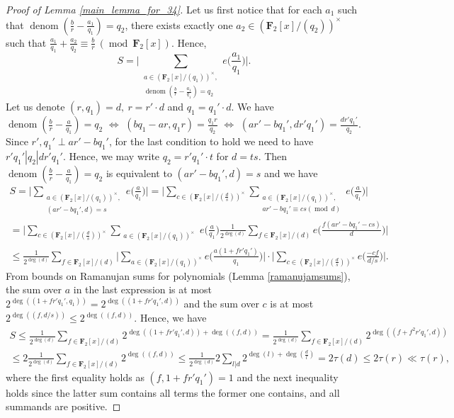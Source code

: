 \documentclass[11pt, reqno]{amsart}
\numberwithin{equation}{section}
\newcommand{\zff}{\mathbf{F}_2[x]}
\newcommand{\zffmi}[1]{(\zff/(#1))^{\times}}
\newcommand\denom{\operatorname{denom}}
\newcommand\modd{\operatorname{mod}}
\begin{document}
\begin{proof}[Proof of Lemma \ref{main_lemma_for_34}]
    Let us first notice that for each $a_1$ such that $\denom(\frac{b}{r}-\frac{a_1}{q_1})=q_2$, there exists exactly one $a_2 \in \zffmi{q_2}$ such that $\frac{a_1}{q_1}+\frac{a_2}{q_2} \equiv \frac{b}{r} \ (\modd \ \zff)$. Hence, $$S=\bigg| \sum_{\substack{a \in \zffmi{q_1}, \\ \denom(\frac{b}{r}-\frac{a_1}{q_1})=q_2}} e \Big( \frac{a_1}{q_1} \Big) \bigg|.$$
    Let us denote $(r, q_1)=d, \ r=r' \cdot d$ and $q_1 = q_1' \cdot d$. We have $\denom(\frac{b}{r}-\frac{a}{q_1})=q_2$ $\iff$ $(bq_1-ar, q_1r)=\frac{q_1r}{q_2}$ $\iff$ $(ar'-bq_1', dr'q_1')=\frac{dr'q_1'}{q_2}$. Since $r', q_1' \perp ar'-bq_1'$, for the last condition to hold we need to have $r'q_1' | q_2 | dr'q_1'$. Hence, we may write $q_2=r'q_1' \cdot t$ for $d=ts$. Then $\denom(\frac{b}{r}-\frac{a}{q_1})=q_2$ is equivalent to $(ar'-bq_1', d)=s$ and we have
    \begin{multline*}
        S
        = \bigg| \sum_{\substack{a \in \zffmi{q_1}, \\ (ar'-bq_1', d)=s}}  e \Big( \frac{a}{q_1} \Big) \bigg|
        = \bigg| \sum_{c \in \zffmi{\frac{d}{s}}} \sum_{\substack{a \in \zffmi{q_1}, \\ ar'-bq_1' \equiv cs (\modd \ d)}} e \Big( \frac{a}{q_1} \Big) \bigg| \\
        = \bigg| \sum_{c \in \zffmi{\frac{d}{s}}} \sum_{\substack{a \in \zffmi{q_1}}} e \Big( \frac{a}{q_1} \Big) \frac{1}{2^{\deg( d )}} \sum_{f \in \zff / (d)} e \Big( \frac{f(ar'-bq_1' - cs)}{d} \Big) \bigg| \\
        \leqslant \frac{1}{2^{\deg( d )}} \sum_{f \in \zff / (d)} \bigg| \sum_{a \in \zffmi{q_1}} e \Big( \frac{a(1+f r'q_1')}{q_1} \Big) \bigg| \cdot \bigg| \sum_{c \in \zffmi{\frac{d}{s}}} e \Big( \frac{-cf}{d/s} \Big) \bigg|.
    \end{multline*}
    From bounds on Ramanujan sums for polynomials (Lemma \ref{ramanujamsums}), the sum over $a$ in the last expression is at most $2^{\deg( (1+fr' q_1', q_1) )}=2^{\deg( (1+f r' q_1', d) )}$ and the sum over $c$ is at most $2^{\deg( (f, d/s) )} \leqslant 2^{\deg( (f, d) )}$. Hence, we have
    \begin{multline*}
        S
        \leqslant \frac{1}{2^{\deg( d )}} \sum_{f \in \zff / (d)} 2^{\deg( (1+f r' q_1', d)) + \deg( (f, d) )}
        = \frac{1}{2^{\deg( d )}} \sum_{f \in \zff / (d)} 2^{\deg( (f+f^2 r' q_1', d) )} \\
        \leqslant 2\frac{1}{2^{\deg( d )}} \sum_{f \in \zff / (d)} 2^{\deg( (f, d) )}
        \leqslant \frac{1}{2^{\deg( d )}} 2\sum_{l | d} 2^{\deg( l ) + \deg( \frac{d}{l} )}
        = 2\tau(d) \leqslant 2\tau(r) \ll \tau(r),
    \end{multline*}
    where the first equality holds as $(f, 1+f r' q_1')=1$ and the next inequality holds since the latter sum contains all terms the former one contains, and all summands are positive.
\end{proof}
\end{document}
